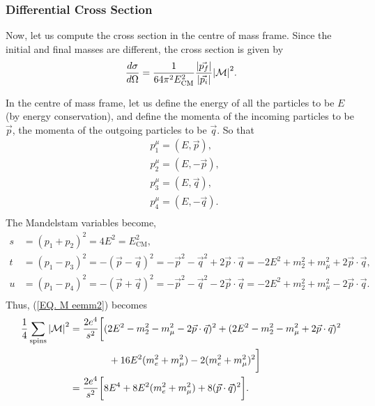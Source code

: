 \documentclass[11pt]{article}
\theoremstyle{definition}
\begin{document}
\subsubsection{Differential Cross Section}
Now, let us compute the cross section in the centre of mass frame. Since the initial and final masses are different, the cross section is given by
\begin{equation}
    \frac{d\sigma}{d\Omega} = \frac{1}{64\pi^2E_{\text{CM}}^2}\frac{\abs{\vec{p_f}}}{\abs{\vec{p_i}}}\abs{\mathcal{M}}^2.
\end{equation}

In the centre of mass frame, let us define the energy of all the particles to be $E$ (by energy conservation), and define the momenta of the incoming particles to be $\vec{p}$, the momenta of the outgoing particles to be $\vec{q}$. So that
\begin{equation}
    \begin{aligned}
        &p_1^\mu = (E, \vec{p}),\\
        &p_2^\mu = (E, -\vec{p}),\\
        &p_3^\mu = (E, \vec{q}),\\
        &p_4^\mu = (E, -\vec{q}).\\
    \end{aligned}
\end{equation}
The Mandelstam variables become,
\begin{equation}
    \begin{aligned}
        s &= (p_{1} + p_{2})^{2} = 4E^2 = E_\text{CM}^2, \\
        t &= (p_{1} - p_{3})^{2} = -(\vec{p}-\vec{q})^2 = -\vec{p}^2 - \vec{q}^2 +2\vec{p}\cdot\vec{q} =  -2E^2 + m_2^2 + m_\mu^2 + 2\vec{p}\cdot\vec{q}, \\
        u &= (p_{1} - p_{4})^{2} = -(\vec{p}+\vec{q})^2 = -\vec{p}^2 - \vec{q}^2 -2\vec{p}\cdot\vec{q} = - 2E^2 + m_2^2 + m_\mu^2 -2\vec{p}\cdot\vec{q}. \\
    \end{aligned}   
\end{equation}
Thus, (\ref{EQ. M eemm2}) becomes
\begin{equation}
    \begin{aligned}
        \frac{1}{4}\sum_\text{spins}\abs{\mathcal{M}}^2 &= \frac{2e^4}{s^2}\bigg[ (2E^2 - m_2^2 - m_\mu^2 -2\vec{p}\cdot\vec{q})^2 + (2E^2 - m_2^2 - m_\mu^2 +2\vec{p}\cdot\vec{q})^2 \\
        &\qquad \qquad + 16E^2(m_e^2+m_\mu^2) - 2(m_e^2+m_\mu^2)^2\bigg] \\
        &= \frac{2e^4}{s^2}\bigg[8E^4 + 8E^2(m_e^2+m_\mu^2) + 8(\vec{p}\cdot\vec{q})^2 \bigg].
    \end{aligned}
\end{equation}
\end{document}
